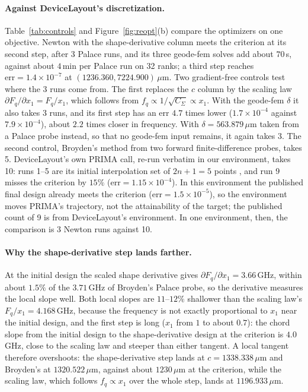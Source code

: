 \documentclass{anvil-paper}
\begin{document}
\paragraph{Against DeviceLayout's discretization.}
Table~\ref{tab:controls} and Figure~\ref{fig:reopt}(b) compare the
optimizers on one objective. Newton
with the shape-derivative column meets the criterion at its second step,
after 3 Palace runs, and its three geode-fem solves add about $70$\,s,
against about $4$\,min per Palace run on 32 ranks; a third step reaches
$\mathrm{err} = 1.4\times10^{-7}$ at $(1236.360, 7224.900)\,\mu$m. Two
gradient-free controls test where the 3 runs come from. The first replaces
the $c$ column by the scaling law $\partial F_q/\partial x_1 = F_q/x_1$,
which follows from $f_q \propto 1/\sqrt{C_\Sigma} \propto x_1$. With the
geode-fem $\delta$ it also takes 3 runs, and its first step has an err
$4.7$ times lower ($1.7\times10^{-4}$ against $7.9\times10^{-4}$), about
$2.2$ times closer in frequency. With $\delta = 563.879\,\mu$m taken from a
Palace probe instead, so that no geode-fem input remains, it again takes 3.
The second control, Broyden's method \citep{broyden1965class} from two
forward finite-difference probes, takes 5. DeviceLayout's own PRIMA call,
re-run verbatim in our environment, takes 10: runs 1--5 are its initial
interpolation set of $2n+1 = 5$ points \citep{powell2009bobyqa}, and run 9 misses the criterion by $15\%$ ($\mathrm{err} =
1.15\times10^{-4}$). In this environment the published final design already
meets the criterion ($\mathrm{err} = 1.5\times10^{-5}$), so the environment
moves PRIMA's trajectory, not the attainability of the target; the
published count of 9 is from DeviceLayout's environment. In one
environment, then, the comparison is 3 Newton runs against 10.

\paragraph{Why the shape-derivative step lands farther.}
At the initial design the scaled shape derivative gives
$\partial F_q/\partial x_1 = 3.66$\,GHz, within about $1.5\%$ of the $3.71$\,GHz
of Broyden's Palace probe, so the derivative measures the local slope
well. Both local slopes are $11$--$12\%$ shallower than the scaling law's
$F_q/x_1 = 4.168$\,GHz, because the frequency is not exactly proportional
to $x_1$ near the initial design, and the first step is long ($x_1$ from
$1$ to about $0.7$): the chord slope from the initial design to the
shape-derivative design at the criterion is $4.0$\,GHz, close to the
scaling law and steeper than either tangent. A local tangent therefore
overshoots: the
shape-derivative step lands at $c = 1338.338\,\mu$m and Broyden's at
$1320.522\,\mu$m, against about $1230\,\mu$m at the criterion, while the
scaling law, which follows $f_q \propto x_1$ over the whole step, lands at
$1196.933\,\mu$m.
\end{document}

